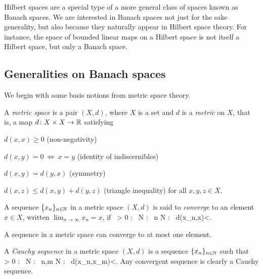 
Hilbert spaces are a special type of a more general class of spaces known as Banach spaces. We are interested in Banach spaces not just for the sake generality, but also because they naturally appear in Hilbert space theory. For instance, the space of bounded linear maps on a Hilbert space is not itself a Hilbert space, but only a Banach space.

\subsection{Generalities on Banach spaces}

We begin with some basis notions from metric space theory.

\bd
A \emph{metric space} is a pair $(X,d)$, where $X$ is a set and $d$ is a \emph{metric} on $X$, that is, a map $d\colon X\times X \to \mathbb{R}$ satisfying
\ben[label=(\roman*)]
\item $d(x,x)\geq 0$ \hfill (non-negativity)
\item $d(x,y) = 0\ \Leftrightarrow \ x=y$ \hfill (identity of indiscernibles)
\item $d(x,y)=d(y,x)$ \hfill (symmetry)
\item $d(x,z)\leq d(x,y)+d(y,z)$ \hfill (triangle inequality)
\een
for all $x,y,z\in X$.
\ed

\bd
A sequence $\{x_n\}_{n\in \mathbb{N}}$ in a metric space $(X,d)$ is said to \emph{converge} to an element $x\in X$, written $\displaystyle \lim_{n\to \infty}x_n=x$, if
\bse
\forall \, \varepsilon > 0 : \exists \, N \in \N : \forall \, n \geq N : \ d(x_n,x)<\varepsilon.
\ese
\ed

A sequence in a metric space can converge to at most one element.

\bd
A \emph{Cauchy sequence} in a metric space $(X,d)$ is a sequence $\{x_n\}_{n\in \mathbb{N}}$ such that
\bse
\forall \, \varepsilon > 0 : \exists \, N \in \N : \forall \, n,m \geq N : \ d(x_n,x_m)<\varepsilon.
\ese
\ed
Any convergent sequence is clearly a Cauchy sequence.

